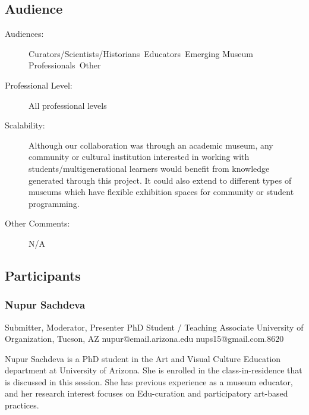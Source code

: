 \documentclass{report}
\begin{document}
              \subsection*{Audience}
                \begin{description}
                  \item [Audiences:]Curators/Scientists/Historians~Educators~Emerging Museum Professionals~Other~
                  \item[Professional Level:]All professional levels~
                \item[Scalability:] Although our collaboration was through an academic museum, any community or cultural institution interested in working with students/multigenerational learners would benefit from knowledge generated through this project. It could also extend to different types of museums which have flexible exhibition spaces for community or student programming.

							
              \item[Other Comments:] N/A
              \end{description}
            \subsection*{Participants}
              \subsubsection*{ Nupur Sachdeva }
              Submitter, Moderator, Presenter\newline
              PhD Student / Teaching Associate\newline
              University of Organization, Tucson, AZ
              \newline
              nupur@email.arizona.edu\newline
              nups15@gmail.com.8620\newline

              Nupur Sachdeva is a PhD student in the Art and Visual Culture Education department at University of Arizona. She is enrolled in the class-in-residence that is discussed in this session. She has previous experience as a museum educator, and her research interest focuses on Edu-curation and participatory art-based practices.\newline
\end{document}
